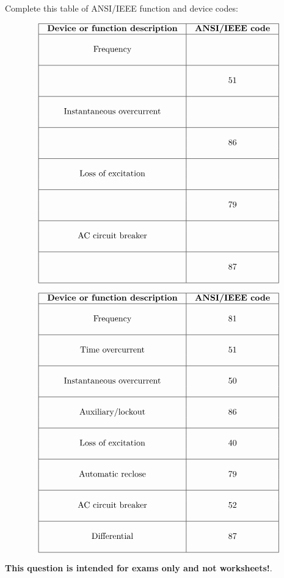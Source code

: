 

Complete this table of ANSI/IEEE function and device codes:


$$\vbox{\offinterlineskip
\halign{\strut
\vrule \quad\hfil # \ \hfil & 
\vrule \quad\hfil # \ \hfil \vrule \cr
\noalign{\hrule}
%
{\bf Device or function description} & {\bf ANSI/IEEE code} \cr
%
\noalign{\hrule}
%
 &  \cr
Frequency &  \cr
 &  \cr
%
\noalign{\hrule}
%
 &  \cr
 & 51 \cr
 &  \cr
%
\noalign{\hrule}
%
 &  \cr
Instantaneous overcurrent &  \cr
 &  \cr
%
\noalign{\hrule}
%
 &  \cr
 & 86 \cr
 &  \cr
%
\noalign{\hrule}
%
 &  \cr
Loss of excitation &  \cr
 &  \cr
%
\noalign{\hrule}
%
 &  \cr
 & 79 \cr
 &  \cr
%
\noalign{\hrule}
%
 &  \cr
AC circuit breaker &  \cr
 &  \cr
%
\noalign{\hrule}
%
 &  \cr
 & 87 \cr
 &  \cr
%
\noalign{\hrule}
} %
}$$ %









$$\vbox{\offinterlineskip
\halign{\strut
\vrule \quad\hfil # \ \hfil & 
\vrule \quad\hfil # \ \hfil \vrule \cr
\noalign{\hrule}
%
{\bf Device or function description} & {\bf ANSI/IEEE code} \cr
%
\noalign{\hrule}
%
 &  \cr
Frequency & 81 \cr
 &  \cr
%
\noalign{\hrule}
%
 &  \cr
Time overcurrent & 51 \cr
 &  \cr
%
\noalign{\hrule}
%
 &  \cr
Instantaneous overcurrent & 50 \cr
 &  \cr
%
\noalign{\hrule}
%
 &  \cr
Auxiliary/lockout & 86 \cr
 &  \cr
%
\noalign{\hrule}
%
 &  \cr
Loss of excitation & 40 \cr
 &  \cr
%
\noalign{\hrule}
%
 &  \cr
Automatic reclose & 79 \cr
 &  \cr
%
\noalign{\hrule}
%
 &  \cr
AC circuit breaker & 52 \cr
 &  \cr
%
\noalign{\hrule}
%
 &  \cr
Differential & 87 \cr
 &  \cr
%
\noalign{\hrule}
} %
}$$ %







{\bf This question is intended for exams only and not worksheets!}.



